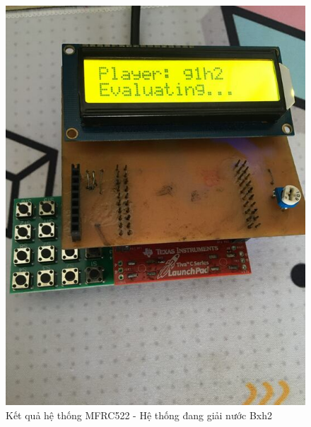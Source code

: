 \begin{figure}[ht]
\centering
\includegraphics[scale=0.4]{images/chess_g1h2.jpg}
\caption{Kết quả hệ thống MFRC522 - Hệ thống đang giải nước Bxh2}
\label{fig:chess_g1h2}
\end{figure}


